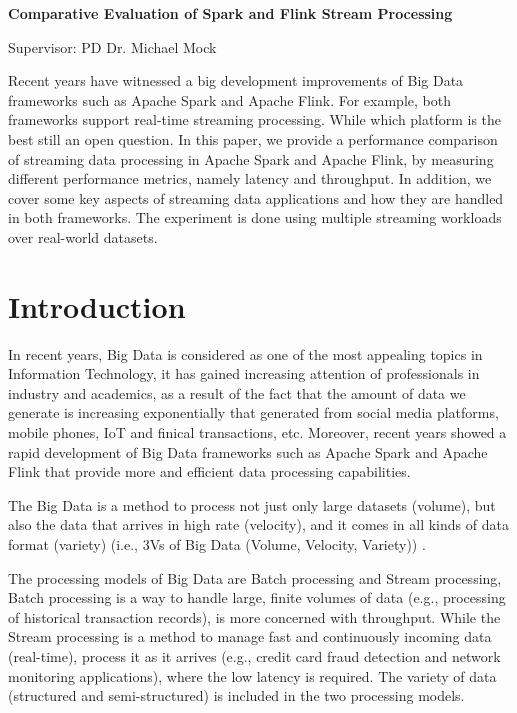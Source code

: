 \documentclass[]{article}
\begin{document}
\begin{flushleft}
\centering\LARGE {\bf Comparative Evaluation of Spark and Flink Stream Processing}

Supervisor: PD Dr. Michael Mock
\thispagestyle{empty}
\end{flushleft}
\newpage
\tableofcontents

\newpage


\begin{abstract}

\end{abstract}
Recent years have witnessed a big development improvements of Big Data frameworks such as Apache Spark and Apache Flink. For example, both frameworks support real-time
streaming processing. While which platform is the best still an open question. 
In this paper, we provide a performance comparison of streaming data processing in Apache Spark and Apache Flink, by measuring different performance metrics, namely latency and throughput. In addition, we cover some key aspects of streaming data applications and how they are handled in both frameworks. The experiment is done using multiple streaming workloads over real-world datasets.
\section{Introduction}

\par In recent years, Big Data is considered as one of the most appealing topics in Information Technology, it has gained increasing attention of professionals in industry and academics, as a result of the fact that the amount of data we generate is increasing exponentially \cite{idc} that generated from social media platforms, mobile phones, IoT and finical transactions, etc. Moreover, recent years showed a rapid development of Big Data frameworks such as Apache Spark and Apache Flink that provide more and efficient data processing capabilities.
 \par The Big Data is a method to process not just only large datasets (volume), but also the data that arrives in high rate (velocity), and it comes in all kinds of data format (variety) (i.e., 3Vs of Big Data (Volume, Velocity, Variety)) \cite{svs}.

\par The processing models of Big Data are Batch processing and Stream processing, Batch processing is a way to handle large, finite volumes of data (e.g., processing of historical transaction records), is more concerned with throughput. While the Stream processing  is a method to manage fast and continuously incoming data (real-time), process it as it arrives (e.g., credit card fraud detection and network monitoring applications), where the low latency is required. The variety of data (structured and semi-structured) is included in the two processing models.
\end{document}
